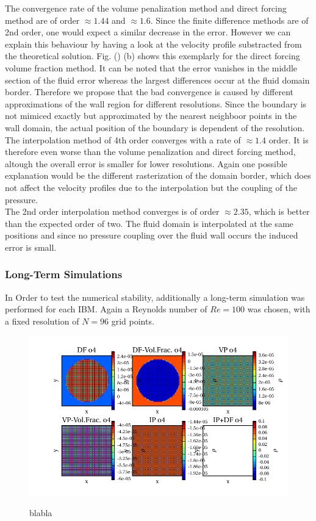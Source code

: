 The convergence rate of the volume penalization method and direct forcing method are of order $\approx 1.44$ and $\approx 1.6$.
Since the finite difference methods are of 2nd order, one would expect a similar decrease in the error.
However we can explain this behaviour by having a look at the velocity profile substracted from the theoretical solution.
Fig. () (b) shows this exemplarly for the direct forcing volume fraction method. It can be noted that
the error vanishes in the middle section of the fluid error whereas the largest differences occur at the fluid domain border.
Therefore we propose that the bad convergence is caused by different approximations of the wall region for different resolutions.
Since the boundary is not mimiced exactly but approximated by the nearest neighboor points in the wall domain, the actual position
of the boundary is dependent of the resolution.\\
The interpolation method of 4th order converges with a rate of $\approx 1.4$ order. It is therefore even worse than the volume penalization and
direct forcing method, altough the overall error is smaller for lower resolutions. Again one possible explanation would be the different rasterization
of the domain border, which does not affect the velocity profiles due to the interpolation but the coupling of the pressure.\\
The 2nd order interpolation method converges is of order $\approx 2.35$, which is better than the expected order of two.
The fluid domain is interpolated at the same positions and since no pressure coupling over the fluid wall occurs the induced error is small.


\subsubsection{Long-Term Simulations}

In Order to test the  numerical stability, additionally a long-term simulation was performed for each IBM.
Again a Reynolds number of $Re=100$ was chosen, with a fixed resolution of $N=96$ grid points.


\begin{figure}[!pt]
  \centering
  \includegraphics{gfx/immersed_boundary/hpflow/long/rho.pdf}\label{fig:hpflow_allgc_theo}
  \caption{blabla}
\end{figure}

